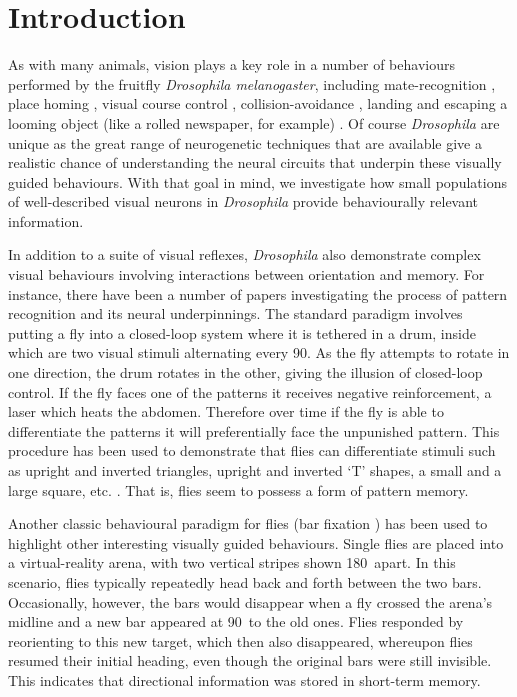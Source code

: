 \section*{Introduction}
As with many animals, vision plays a key role in a number of behaviours performed by the fruitfly \emph{Drosophila melanogaster}, including mate-recognition \cite{Agrawal2014}, place homing \cite{Ofstad2011}, visual course control \cite{Borst2014}, collision-avoidance \cite{Tammero2002}, landing \cite{Tammero2002} and escaping a looming object (like a rolled newspaper, for example) \cite{Card2008}.
Of course \emph{Drosophila} are unique as the great range of neurogenetic techniques that are available give a realistic chance of understanding the neural circuits that underpin these visually guided behaviours. With that goal in mind, we investigate how small populations of well-described visual neurons in \emph{Drosophila} provide behaviourally relevant information.

In addition to a suite of visual reflexes, \emph{Drosophila} also demonstrate complex visual behaviours involving interactions between orientation and memory.
For instance, there have been a number of papers investigating the process of pattern recognition and its neural underpinnings\cite{Pan2009,Liu2006,Ernst1999}.
The standard paradigm involves putting a fly into a closed-loop system where it is tethered in a drum, inside which are two visual stimuli alternating every 90\degree. As the fly attempts to rotate in one direction, the drum rotates in the other, giving the illusion of closed-loop control. If the fly faces one of the patterns it receives negative reinforcement, a laser which heats the abdomen. Therefore over time if the fly is able to differentiate the patterns it will preferentially face the unpunished pattern. This procedure has been used to demonstrate that flies can differentiate stimuli such as upright and inverted triangles, upright and inverted `T' shapes, a small and a large square, etc. \cite{Ernst1999}. That is, flies seem to possess a form of pattern memory.

Another classic behavioural paradigm for flies (bar fixation \cite{Neuser2008}) has been used to highlight other interesting visually guided behaviours.
Single flies are placed into a virtual-reality arena, with two vertical stripes shown 180\degree\ apart.
In this scenario, flies typically repeatedly head back and forth between the two bars.
Occasionally, however, the bars would disappear when a fly crossed the arena's midline and a new bar appeared at 90\degree\ to the old ones.
Flies responded by reorienting to this new target, which then also disappeared, whereupon flies resumed their initial heading, even though the original bars were still invisible. This indicates that directional information was stored in short-term memory.

